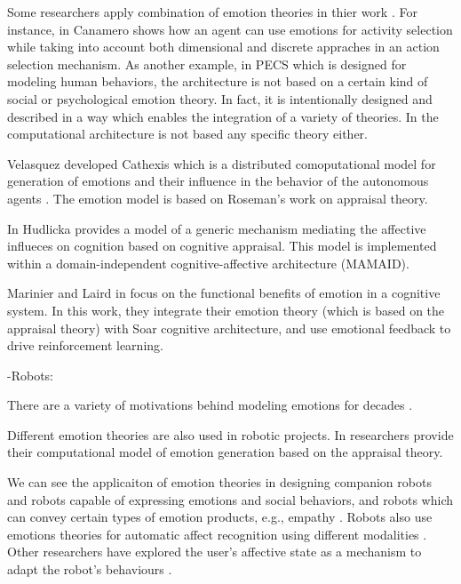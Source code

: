 \documentclass[11pt]{article}
\begin{document}
Some researchers apply combination of emotion theories in thier work
\cite{kiryazov:modeling-appraisal-pad}. For instance, in
\cite{canamero:designing-activity-selection} Canamero shows how an agent can use
emotions for activity selection while taking into account both dimensional and
discrete appraches in an action selection mechanism. As another example, in PECS
\cite{urban:pecs} which is designed for modeling human behaviors, the
architecture is not based on a certain kind of social or psychological emotion
theory. In fact, it is intentionally designed and described in a way which
enables the integration of a variety of theories. In
\cite{miranda:teamwork-multiagent-system} the computational architecture is not
based any specific theory either.

Velasquez developed Cathexis which is a distributed comoputational model for
generation of emotions and their influence in the behavior of the autonomous
agents \cite{velasquez:emotions-motivations-agents}. The emotion model is based
on Roseman's work on appraisal theory.

In \cite{hudlicka:emotinos-reasons} Hudlicka provides a model of a generic
mechanism mediating the affective influeces on cognition based on cognitive
appraisal. This model is implemented within a domain-independent
cognitive-affective architecture (MAMAID).

Marinier and Laird in \cite{marinier:emotion-reinforcement} focus on the
functional benefits of emotion in a cognitive system. In this work, they
integrate their emotion theory (which is based on the appraisal theory) with
Soar cognitive architecture, and use emotional feedback to drive reinforcement
learning.

-Robots:

There are a variety of motivations behind modeling emotions for decades
\cite{wehrle:motivations-modeling-emotion}.

Different emotion theories are also used in robotic projects. In
\cite{kim:model-hri-appraisal} researchers provide their computational model
of emotion generation based on the appraisal theory.

We can see the applicaiton of emotion theories in designing companion robots and
robots capable of expressing emotions and social behaviors, and robots which can
convey certain types of emotion products, e.g., empathy
\cite{breazeal:expressive-behavior} 
\cite{leite:empathy-hri} \cite{paiva:emotion-modeling}
\cite{shayganfar:methodology}. Robots also use emotions theories for automatic
affect recognition using different modalities \cite{hegel:empathic-robot}
\cite{zeng:affect-recognition}. Other researchers have explored the user’s
affective state as a mechanism to adapt the robot’s behaviours
\cite{liu:affect-robot-behavior} \cite{breazeal:sociable-robot}.
\end{document}
